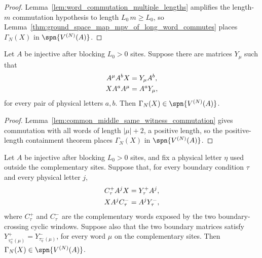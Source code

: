 \begin{proof}
    \leanok
    Lemma~\ref{lem:word_commutation_multiple_lengths} amplifies the length-$m$
    commutation hypothesis to length $L_0\,m \ge L_0$, so
    Lemma~\ref{thm:ground_space_map_mpv_of_long_word_commutes} places
    $\Gamma_N(X)$ in $\spn\{V^{(N)}(A)\}$.
\end{proof}

\begin{lemma}
    \label{thm:ground_space_map_mpv_of_common_middle}
    \leanok
    Let $A$ be injective after blocking $L_0>0$ sites. Suppose there are
    matrices $Y_\mu$ such that
    \begin{align}
        A^\mu A^b X & = Y_\mu A^b, \notag \\
        X A^a A^\mu & = A^a Y_\mu, \notag
    \end{align}
    for every pair of physical letters $a,b$. Then
    $\Gamma_N(X)\in\spn\{V^{(N)}(A)\}$.
\end{lemma}

\begin{proof}
    \leanok
    Lemma~\ref{lem:common_middle_same_witness_commutation} gives commutation
    with all words of length $|\mu|+2$, a positive length, so the
    positive-length containment theorem places $\Gamma_N(X)$ in
    $\spn\{V^{(N)}(A)\}$.
\end{proof}

\begin{lemma}
    \label{thm:ground_space_map_mpv_of_wrapped_witness_comparison}
    \leanok
    Let $A$ be injective after blocking $L_0>0$ sites, and fix a physical letter
    $\eta$ used outside the complementary sites. Suppose that, for every
    boundary condition $\tau$ and every physical letter $j$,
    \begin{align}
        C^+_\tau A^jX & = Y^+_\tau A^j, \notag \\
        XA^jC^-_\tau  & = A^jY^-_\tau, \notag
    \end{align}
    where $C^+_\tau$ and $C^-_\tau$ are the complementary words exposed by the
    two boundary-crossing cyclic windows. Suppose also that the two boundary
    matrices satisfy
    $Y^+_{\tau^+_\eta(\mu)} = Y^-_{\tau^-_\eta(\mu)}$,
    for every word $\mu$ on the complementary sites. Then
    $\Gamma_N(X)\in\spn\{V^{(N)}(A)\}$.
\end{lemma}


